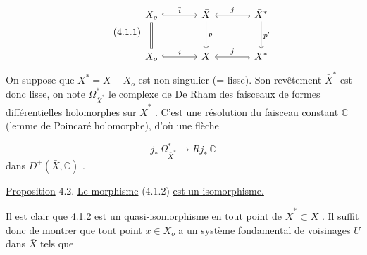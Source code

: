 \begin{equation}\tag{4.1.1}
\begin{tikzcd}[column sep=large, row sep=large]
X_o \arrow[r, hook, "\bar{i}"] \arrow[d, equal] & \bar{X} \arrow[d, "p"] & \bar{X}^* \arrow[l, hook, "\bar{j}"'] \arrow[d, "p'"] \\
X_o \arrow[r, hook, "i"] & X & X^* \arrow[l, hook, "j"']
\end{tikzcd}
\end{equation}
On suppose que $X^* = X - X_o$ est non singulier (= lisse). Son revêtement $\bar{X}^*$ est donc lisse, on note $\Omega^*_{\bar{X}^*}$ le complexe de De Rham des faisceaux de formes différentielles holomorphes sur $\bar{X}^*$ . C'est une résolution du faisceau constant $\mathbb{C}$ (lemme de Poincaré holomorphe), d'où une flèche

\begin{equation}\tag{4.1.2}
\bar{j}_* \, \Omega^*_{\bar{X}^*} \longrightarrow R\bar{j}_* \, \mathbb{C}
\end{equation}
dans $D^+(\bar{X}, \mathbb{C})$ .

\underline{Proposition} 4.2.  \underline{Le morphisme} (4.1.2) \underline{est un isomorphisme.}

Il est clair que 4.1.2 est un quasi-isomorphisme en tout point de $\bar{X}^* \subset \bar{X}$ . Il suffit donc de montrer que tout point $x \in X_o$ a un système fondamental de voisinages $U$ dans $\bar{X}$ tels que

